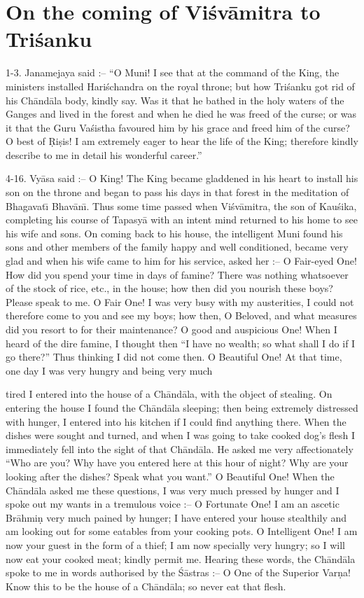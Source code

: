 \chapter{On the coming of Vi\'sv\=amitra to Tri\'sanku}

1-3. Janamejaya said :-- ``O Muni! I see that at the command of the King, the ministers installed Hari\'schandra on the royal throne; but how Tri\'sanku got rid of his Ch\=and\=ala body, kindly say. Was it that he bathed in the holy waters of the Ganges and lived in the forest and when he died he was freed of the curse; or was it that the Guru Va\'sistha favoured him by his grace and freed him of the curse? O best of \d{R}i\d{s}is! I am extremely eager to hear the life of the King; therefore kindly describe to me in detail his wonderful career.''

4-16. Vy\=asa said :-- O King! The King became gladdened in his heart to install his son on the throne and began to pass his days in that forest in the meditation of Bhagavat\={\i} Bhav\=an\={\i}. Thus some time passed when Vi\'sv\=amitra, the son of Kau\'sika, completing his course of Tapasy\=a with an intent mind returned to his home to see his wife and sons. On coming back to his house, the intelligent Muni found his sons and other members of the family happy and well conditioned, became very glad and when his wife came to him for his service, asked her :-- O Fair-eyed One! How did you spend your time in days of famine? There was nothing whatsoever of the stock of rice, etc., in the house; how then did you nourish these boys? Please speak to me. O Fair One! I was very busy with my austerities, I could not therefore come to you and see my boys; how then, O Beloved, and what measures did you resort to for their maintenance? O good and auspicious One! When I heard of the dire famine, I thought then ``I have no wealth; so what shall I do if I go there?'' Thus thinking I did not come then. O Beautiful One! At that time, one day I was very hungry and being very much

tired I entered into the house of a Ch\=and\=ala, with the object of stealing. On entering the house I found the Ch\=and\=ala sleeping; then being extremely distressed with hunger, I entered into his kitchen if I could find anything there. When the dishes were sought and turned, and when I was going to take cooked dog's flesh I immediately fell into the sight of that Ch\=and\=ala. He asked me very affectionately ``Who are you? Why have you entered here at this hour of night? Why are your looking after the dishes? Speak what you want.'' O Beautiful One! When the Ch\=and\=ala asked me these questions, I was very much pressed by hunger and I spoke out my wants in a tremulous voice :-- O Fortunate One! I am an ascetic Br\=ahmi\d{n} very much pained by hunger; I have entered your house stealthily and am looking out for some eatables from your cooking pots. O Intelligent One! I am now your guest in the form of a thief; I am now specially very hungry; so I will now eat your cooked meat; kindly permit me. Hearing these words, the Ch\=and\=ala spoke to me in words authorised by the \'S\=astras :-- O One of the Superior Var\d{n}a! Know this to be the house of a Ch\=and\=ala; so never eat that flesh.

